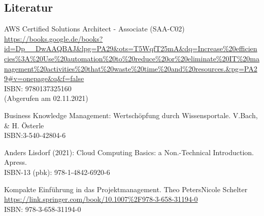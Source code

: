 

%
% 

\thispagestyle{empty}
\subsection*{Literatur}
\renewcommand{\refname}{} %
\begin{comment}
\printbibliography[title={Neue Literatur}]
\end{comment}

\begin{thebibliography}{SW11} %
   AWS Certified Solutions Architect - Associate (SAA-C02)\\
  \url{https://books.google.de/books?id=Dp__DwAAQBAJ&lpg=PA29&ots=T5WqfT25mA&dq=Increase%20efficiencies%3A%20Use%20automation%20to%20reduce%20or%20eliminate%20IT%20management%20activities%20that%20waste%20time%20and%20resources.&pg=PA29#v=onepage&q&f=false}
  \\ISBN: 9780137325160
  \\(Abgerufen am 02.11.2021)
  
   Business Knowledge Management: Wertschöpfung durch Wissensportale. V.Bach, \& H. Österle\\
  ISBN:3-540-42804-6
 
   Anders Lisdorf (2021): Cloud Computing Basics: a Non.-Technical Introduction. Apress.\\ 
  ISBN-13 (pbk): 978-1-4842-6920-6 
  
   Kompakte Einführung in das Projektmanagement. Theo PetersNicole Schelter
  \url{https://link.springer.com/book/10.1007%2F978-3-658-31194-0}
  \\ISBN: 978-3-658-31194-0
\end{thebibliography}

